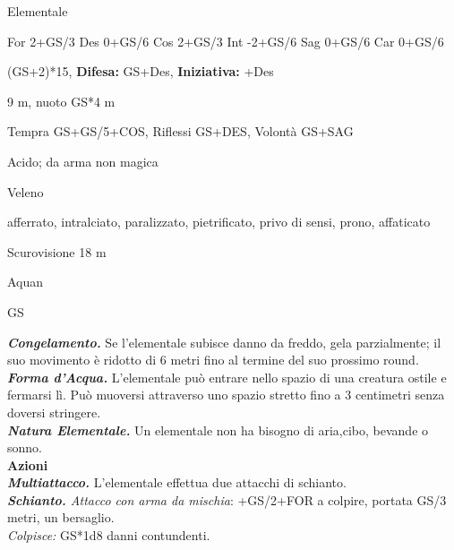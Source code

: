 \begin{multicols}{2}
{%

\noindent


\begin{description}[noitemsep, topsep=0pt, parsep=0pt, partopsep=0pt, leftmargin=0cm, labelwidth=2.2cm]
	\item[\textbf{Taglia/Tipo:}] Elementale
	\item[\textbf{Caratt.:}] For 2+GS/3 Des 0+GS/6 Cos 2+GS/3 Int -2+GS/6 Sag 0+GS/6 Car 0+GS/6
	\item[\textbf{Punti Ferita:}] (GS+2)*15, \textbf{Difesa:} GS+Des, \textbf{Iniziativa:} +Des
	\item[\textbf{Movimento:}] 9 m, nuoto GS*4 m
	\item[\textbf{Tiri Salvez.:}] Tempra GS+GS/5+COS, Riflessi GS+DES, Volontà GS+SAG
	\item[\textbf{Res. Danni:}] Acido; da arma non magica
	\item[\textbf{Imm. Danni:}] Veleno
	\item[\textbf{Immunità:}] afferrato, intralciato, paralizzato, pietrificato, privo di sensi, prono, affaticato
	\item[\textbf{Sensi:}] Scurovisione 18 m
	\item[\textbf{Linguaggi:}] Aquan
	\item[\textbf{Sfida:}] GS \\
\end{description}

\emph{\textbf{Congelamento.}} Se l'elementale subisce danno da freddo, gela parzialmente; il suo movimento è ridotto di 6 metri fino al termine del suo prossimo round.\\
\emph{\textbf{Forma d'Acqua.}} L'elementale può entrare nello spazio di una creatura ostile e fermarsi lì. Può muoversi attraverso uno spazio stretto fino a 3 centimetri senza doversi stringere.\\
\emph{\textbf{Natura Elementale.}} Un elementale non ha bisogno di aria,cibo, bevande o sonno.\\
\textbf{Azioni}\\
\emph{\textbf{Multiattacco.}} L'elementale effettua due attacchi di schianto.\\
\emph{\textbf{Schianto.} Attacco con arma da mischia}: +GS/2+FOR a colpire, portata GS/3 metri, un bersaglio.\\
\emph{Colpisce:} GS*1d8 danni contundenti.\\


}
\end{multicols}

